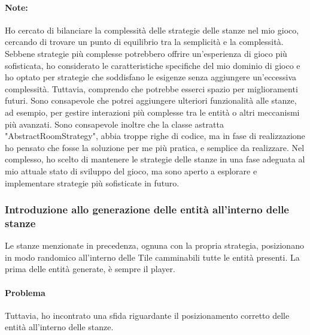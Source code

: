 \documentclass[a4paper,12pt]{report}
\begin{document}
\paragraph*{Note:}
Ho cercato di bilanciare la complessità delle strategie delle stanze nel mio gioco, cercando di trovare un punto di equilibrio tra la semplicità e la complessità. 
Sebbene strategie più complesse potrebbero offrire un'esperienza di gioco più sofisticata, ho considerato le caratteristiche specifiche del mio dominio di gioco e ho optato per strategie che soddisfano le esigenze senza aggiungere un'eccessiva complessità.
Tuttavia, comprendo che potrebbe esserci spazio per miglioramenti futuri.
Sono consapevole che potrei aggiungere ulteriori funzionalità alle stanze, ad esempio, per gestire interazioni più complesse tra le entità o altri meccanismi più avanzati.
Sono consapevole inoltre che la classe astratta "AbstractRoomStrategy", abbia troppe righe di codice, ma in fase di realizzazione ho pensato che fosse la soluzione per me più pratica, e semplice da realizzare. 
Nel complesso, ho scelto di mantenere le strategie delle stanze in una fase adeguata al mio attuale stato di sviluppo del gioco, ma sono aperto a esplorare e implementare strategie più sofisticate in futuro.
\subsubsection*{Introduzione allo generazione delle entità all'interno delle stanze}
Le stanze menzionate in precedenza, ognuna con la propria strategia, posizionano in modo randomico all'interno delle Tile camminabili tutte le entità presenti.
La prima delle entità generate, è sempre il player.
\paragraph*{Problema}
Tuttavia, ho incontrato una sfida riguardante il posizionamento corretto delle entità all'interno delle stanze.
\end{document}

